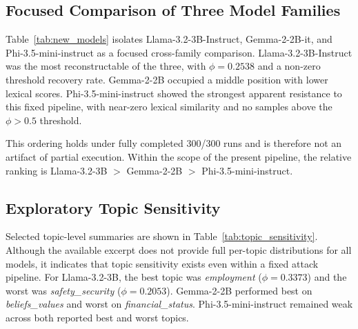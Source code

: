 \documentclass[journal,article,submit,pdftex,moreauthors]{Definitions/mdpi}
\begin{document}
\subsection{Focused Comparison of Three Model Families}
Table~\ref{tab:new_models} isolates Llama-3.2-3B-Instruct, Gemma-2-2B-it, and Phi-3.5-mini-instruct as a focused cross-family comparison. Llama-3.2-3B-Instruct was the most reconstructable of the three, with $\phi=0.2538$ and a non-zero threshold recovery rate. Gemma-2-2B occupied a middle position with lower lexical scores. Phi-3.5-mini-instruct showed the strongest apparent resistance to this fixed pipeline, with near-zero lexical similarity and no samples above the $\phi > 0.5$ threshold.

This ordering holds under fully completed 300/300 runs and is therefore not an artifact of partial execution. Within the scope of the present pipeline, the relative ranking is Llama-3.2-3B $>$ Gemma-2-2B $>$ Phi-3.5-mini-instruct.

\begin{table}[ht]
\centering
\caption{Focused results for three victim-model families.}
\label{tab:new_models}
\end{table}

\subsection{Exploratory Topic Sensitivity}
Selected topic-level summaries are shown in Table~\ref{tab:topic_sensitivity}. Although the available excerpt does not provide full per-topic distributions for all models, it indicates that topic sensitivity exists even within a fixed attack pipeline. For Llama-3.2-3B, the best topic was \emph{employment} ($\phi=0.3373$) and the worst was \emph{safety\_security} ($\phi=0.2053$). Gemma-2-2B performed best on \emph{beliefs\_values} and worst on \emph{financial\_status}. Phi-3.5-mini-instruct remained weak across both reported best and worst topics.
\end{document}
